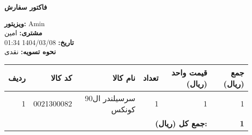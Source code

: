 \documentclass[a4paper,12pt]{article}
\begin{document}
        \begin{center}
            \textbf{\Large فاکتور سفارش}
        \end{center}
        \vspace{0.5cm}
        \begin{flushright}
            \textbf{ویزیتور:} Amin \\
            \textbf{مشتری:} امین \\
            \textbf{تاریخ:} 1404/03/08 01:34 \\
            \textbf{نحوه تسویه:} نقدی
        \end{flushright}
        \vspace{0.5cm}
        \begin{longtable}{|r|r|r|r|r|r|}
            \hline
            \textbf{ردیف} & \textbf{کد کالا} & \textbf{نام کالا} & \textbf{تعداد} & \textbf{قیمت واحد (ریال)} & \textbf{جمع (ریال)} \\
            \hline
            \endhead
                    1 & 0021300082 & سرسيلندر ال90 کونکس & 1 & 1 & 1 \\
            \hline

            \hline
            \multicolumn{5}{|r|}{\textbf{جمع کل (ریال):}} & \textbf{ 1 } \\
            \hline
        \end{longtable}
        
\end{document}
